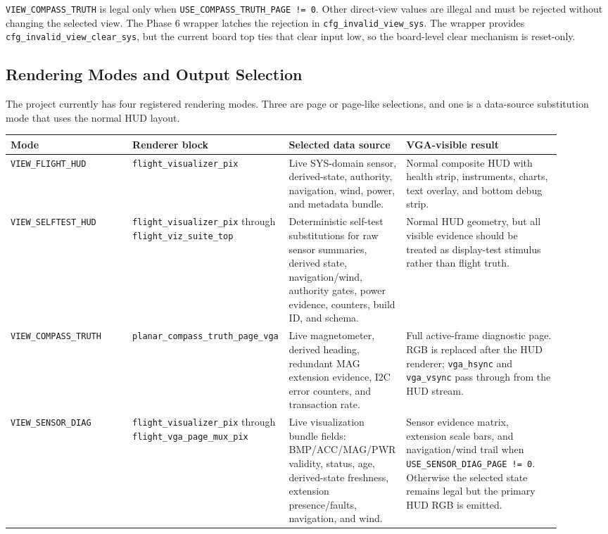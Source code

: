 \documentclass{article}
\newcommand{\sig}[1]{\begingroup\nolinkurl{#1}\endgroup}
\newcommand{\file}[1]{\begingroup\nolinkurl{#1}\endgroup}
\newcommand{\param}[1]{\begingroup\nolinkurl{#1}\endgroup}
\begin{document}
\sig{VIEW_COMPASS_TRUTH} is legal only when
\param{USE_COMPASS_TRUTH_PAGE != 0}.  Other direct-view values are illegal and
must be rejected without changing the selected view.  The Phase 6 wrapper
latches the rejection in \sig{cfg_invalid_view_sys}.  The wrapper provides
\sig{cfg_invalid_view_clear_sys}, but the current board top ties that clear
input low, so the board-level clear mechanism is reset-only.

\subsection{Rendering Modes and Output Selection}

The project currently has four registered rendering modes.  Three are page or
page-like selections, and one is a data-source substitution mode that uses the
normal HUD layout.

\begin{longtable}{p{0.22\linewidth} p{0.20\linewidth} p{0.20\linewidth} p{0.29\linewidth}}
\toprule
\textbf{Mode} & \textbf{Renderer block} & \textbf{Selected data source} & \textbf{VGA-visible result} \\
\midrule
\endhead
\sig{VIEW_FLIGHT_HUD} &
\file{flight_visualizer_pix} &
Live SYS-domain sensor, derived-state, authority, navigation, wind, power, and
metadata bundle. &
Normal composite HUD with health strip, instruments, charts, text overlay, and
bottom debug strip. \\

\sig{VIEW_SELFTEST_HUD} &
\file{flight_visualizer_pix} through \file{flight_viz_suite_top} &
Deterministic self-test substitutions for raw sensor summaries, derived state,
navigation/wind, authority gates, power evidence, counters, build ID, and schema. &
Normal HUD geometry, but all visible evidence should be treated as display-test
stimulus rather than flight truth. \\

\sig{VIEW_COMPASS_TRUTH} &
\file{planar_compass_truth_page_vga} &
Live magnetometer, derived heading, redundant MAG extension evidence, I2C error
counters, and transaction rate. &
Full active-frame diagnostic page.  RGB is replaced after the HUD renderer;
\sig{vga_hsync} and \sig{vga_vsync} pass through from the HUD stream. \\

\sig{VIEW_SENSOR_DIAG} &
\file{flight_visualizer_pix} through \file{flight_vga_page_mux_pix} &
Live visualization bundle fields: BMP/ACC/MAG/PWR validity, status, age,
derived-state freshness, extension presence/faults, navigation, and wind. &
Sensor evidence matrix, extension scale bars, and navigation/wind trail when
\param{USE_SENSOR_DIAG_PAGE != 0}.  Otherwise the selected state remains legal
but the primary HUD RGB is emitted. \\
\bottomrule
\end{longtable}
\end{document}
